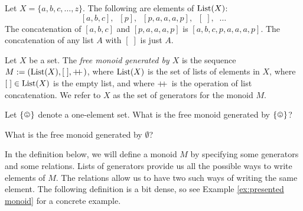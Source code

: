 \begin{definitionRUS}\label{def:list}
\end{definitionRUS}

\begin{exampleENG}
Let $X=\{a,b,c,\ldots,z\}$. The following are elements of $\textnormal{List}(X)$: $$[a,b,c],\;\; [p],\;\; [p,a,a,a,p],\;\; [\;],\;\;\dots$$ The concatenation of $[a,b,c]$ and $[p,a,a,a,p]$ is $[a,b,c,p,a,a,a,p]$. The concatenation of any list $A$ with $[\;]$ is just $A$.
\end{exampleENG}

\begin{exampleRUS}
\end{exampleRUS}

\begin{definitionENG}\label{def:free monoid}
Let $X$ be a set. The {\em free monoid generated by $X$} is the sequence $M:=(\textnormal{List}(X),[\;],+\!\!+\hspace{1pt})$, where $\textnormal{List}(X)$ is the set of lists of elements in $X$, where $[\;]\in\textnormal{List}(X)$ is the empty list, and where $+\!\!+\hspace{1pt}$ is the operation of list concatenation. We refer to $X$ as the set of generators for the monoid $M$.
\end{definitionENG}

\begin{definitionRUS}\label{def:free monoid}
\end{definitionRUS}

\begin{exerciseENG}
Let $\singleton$ denote a one-element set. 
\sexc What is the free monoid generated by $\singleton$? 
\item What is the free monoid generated by $\emptyset$?
\endsexc
\end{exerciseENG}

\begin{exerciseRUS}
\end{exerciseRUS}

\begin{blockENG}
In the definition below, we will define a monoid $M$  by specifying some generators and some relations. Lists of generators provide us all the possible ways to write elements of $M$. The relations allow us to have two such ways of writing the same element. The following definition is a bit dense, so see Example \ref{ex:presented monoid} for a concrete example.
\end{blockENG}

\begin{blockRUS}
\end{blockRUS}

